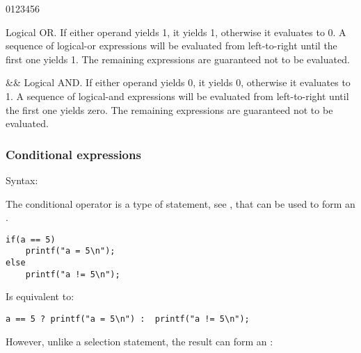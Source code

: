 \begin{production}
\begin{Ventry3}{0123456}
\item[\T{||}]  Logical OR. If either operand yields 1, it yields 1, otherwise
        it evaluates to 0.  A sequence of logical-or expressions will
        be evaluated from left-to-right until the first one yields
        1. The remaining expressions are guaranteed not to be
        evaluated.

\item[\&\&] Logical AND. If either operand yields 0, it yields 0, otherwise
        it evaluates to 1. A sequence of logical-and expressions will
        be evaluated from left-to-right until the first one yields
        zero. The remaining expressions are guaranteed not to be
        evaluated.
\end{Ventry3}
\end{production}


\subsubsection{Conditional expressions}
\label{sec:ConditionalExpression}

Syntax:

\begin{production}
\end{production}

The conditional operator is a type of  statement, see
, that can be used to form an .

\begin{production}
\begin{verbatim}
if(a == 5)
    printf("a = 5\n");
else
    printf("a != 5\n");
\end{verbatim}
\end{production}

Is equivalent to:

\begin{production}
\begin{verbatim}
a == 5 ? printf("a = 5\n") :  printf("a != 5\n");
\end{verbatim}
\end{production}

However, unlike a selection statement, the result can form an
:

